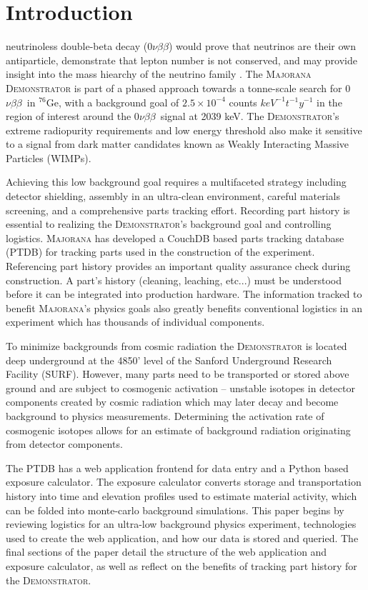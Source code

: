 \documentclass[journal]{IEEEtran}
\def\znbb{0$\nu\beta\beta$}
\def\ge76{$^{76}$Ge}
\begin{document}
\section{Introduction}
 neutrinoless double-beta decay (\znbb) would prove that neutrinos are their own antiparticle,
demonstrate that lepton number is not conserved, and may provide insight into
the mass hiearchy of the neutrino family \cite{phillips_mj} \cite{mj_wilkerson} \cite{avignone_neutrinos}.
The \textsc{Majorana Demonstrator} is part of a phased approach towards a tonne-scale search for \znbb\ in \ge76, with
a background goal of $2.5\times10^{-4}$ counts $keV^{-1} t^{-1} y^{-1}$ \cite{mj_wilkerson} in the region of interest
around the \znbb\ signal at 2039 keV.
The \textsc{Demonstrator}'s extreme radiopurity requirements and low energy threshold also make it sensitive to a signal from dark
matter candidates known as Weakly Interacting Massive Particles (WIMPs).

Achieving this low background goal requires a multifaceted strategy including detector shielding, assembly in an ultra-clean environment,
careful materials screening, and a comprehensive parts tracking effort.
Recording part history is essential to realizing the \textsc{Demonstrator}'s background goal and controlling logistics.
\textsc{Majorana} has developed a CouchDB  \cite{couchdb_guide} based parts tracking database (PTDB)
for tracking parts used in the construction of the experiment. 
Referencing part history provides an important quality assurance check during 
construction. A part's history (cleaning, leaching, etc...) must be 
understood before it can be integrated into production hardware. The information tracked
to benefit \textsc{Majorana}'s physics goals also greatly benefits conventional logistics in an
experiment which has thousands of individual components.


To minimize backgrounds from cosmic radiation the \textsc{Demonstrator} is located deep underground
at the 4850' level of the Sanford Underground Research Facility (SURF).
However, many parts need to be transported or stored above ground and are subject to
cosmogenic activation -- unstable isotopes in detector components created by cosmic radiation which may later decay and become background
to physics measurements.
Determining the activation rate of cosmogenic isotopes allows for an estimate of background
radiation originating from detector components.

The PTDB has a web application frontend
for data entry and a Python based exposure calculator. The exposure calculator converts storage and transportation history 
into time and elevation profiles used to estimate
material activity, which can be folded into monte-carlo background simulations.
This paper begins by reviewing logistics for an ultra-low background
physics experiment, technologies used to create the web application, and
how our data is stored and queried. The final sections of the paper detail
the structure of the web application and exposure calculator, as well as reflect
on the benefits of tracking part history for the \textsc{Demonstrator}.
\end{document}
